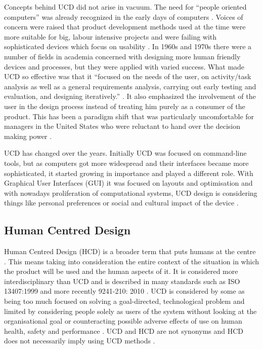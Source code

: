 Concepts behind UCD did not arise in vacuum. The need for “people oriented computers” was already recognized in the early days of computers \citep{ritter2014foundations, nickerson1969man}. Voices of concern were raised that product development methods used at the time were more suitable for big, labour intensive projects and were failing with sophisticated devices which focus on usability \citep{greenbaum1993design, robert1965new}. In 1960s and 1970s there were a number of fields in academia concerned with designing more human friendly devices and processes, but they were applied with varied success. What made UCD so effective was that it “focused on the needs of the user, on activity/task analysis as well as a general requirements analysis, carrying out early testing and evaluation, and designing iteratively.” \citep{ritter2014foundations}. It also emphasized the involvement of the user in the design process instead of treating him purely as a consumer of the product. This has been a paradigm shift that was particularly uncomfortable for managers in the United States who were reluctant to hand over the decision making power \citep{greenbaum1993design}.

UCD has changed over the years.  Initially UCD was focused on command-line tools, but as computers got more widespread and their interfaces became more sophisticated, it started growing in importance and played a different role. With Graphical User Interfaces (GUI) it was focused on layouts and optimisation and with nowadays proliferation of computational systems, UCD design is considering things like personal preferences or social and cultural impact of the device \citep{ritter2014foundations}.

		\subsection{Human Centred Design}

Human Centred Design (HCD) is a broader term that puts humans at the centre \citep{ritter2014foundations, Earthy2001, iso199913407, 1_kurosu_2011}. This means taking into consideration the entire context of the situation in which the product will be used and the human aspects of it. It is considered more interdisciplinary than UCD and is described in many standards \citep{Bevan2001} such as ISO 13407:1999 \citep{iso199913407} and more recently 9241-210: 2010 \citep{dis20099241}. UCD is considered by some as being too much focused on solving a goal-directed, technological problem and limited by considering people solely as users of the system without looking at the organisational goal or counteracting possible adverse effects of use on human health, safety and performance \citep{gasson2003human, gill1996foundations, Bevan2001}. UCD and HCD are not synonyms and HCD does not necessarily imply using UCD methods \citep{Earthy2001, Maguire2001, 1_kurosu_2011, ritter2014foundations}. 
		

